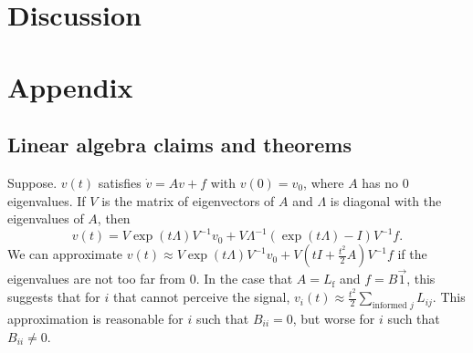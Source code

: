 \documentclass{article}
\begin{document}
\section{Discussion}
%
%

\newpage
\section{Appendix}

\subsection{Linear algebra claims and theorems }

\begin{claim} 
\label{exp_approx}
Suppose. $v(t)$ satisfies $\dot{v}=Av+f$ with $v(0)=v_0$, where $A$ has no $0$ eigenvalues. If $V$ is the matrix of eigenvectors of $A$ and $\Lambda$ is diagonal with the eigenvalues of $A$, then
\begin{equation} \label{diffeq_solution}
v(t)=V\exp(t\Lambda)V^{-1}v_0+V\Lambda^{-1}(\exp(t\Lambda)-I)V^{-1}f.
\end{equation}
We can approximate $v(t)\approx V\exp(t\Lambda)V^{-1}v_0+V(tI+\frac{t^2}{2}A)V^{-1}f$ if the eigenvalues are not too far from $0$. In the case that $A=L_\text{f}$ and $f=B\vec{1}$, this suggests that for $i$ that cannot perceive the signal, $v_i(t)\approx \frac{t^2}{2}\sum_{\text{informed }j }L_{ij}.$ This approximation is reasonable for $i$ such that $B_{ii}=0$, but worse for $i$ such that $B_{ii}\neq 0$. 
\end{claim}
\end{document}
